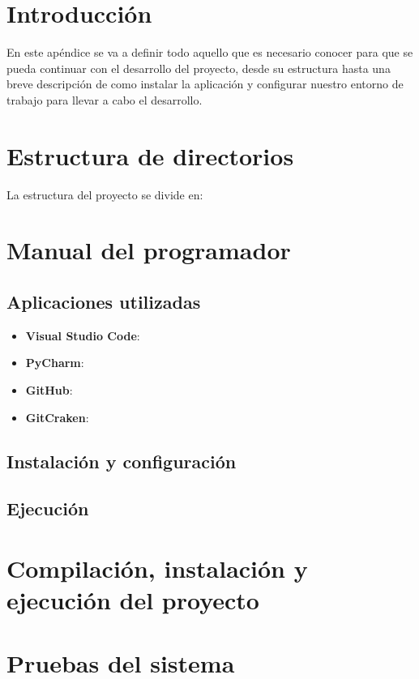 
\section{Introducción}
En este apéndice se va a definir todo aquello que es necesario conocer para que se pueda continuar con el desarrollo del proyecto, desde su estructura hasta una breve descripción de como instalar la aplicación y configurar nuestro entorno de trabajo para llevar a cabo el desarrollo.

\section{Estructura de directorios}
La estructura del proyecto se divide en:

\section{Manual del programador}
\subsection{Aplicaciones utilizadas}
\begin{itemize}
	\item \textbf{Visual Studio Code}: 
	\item \textbf{PyCharm}:
	\item \textbf{GitHub}:
	\item \textbf{GitCraken}:
\end{itemize}
\subsection{Instalación y configuración}
\subsection{Ejecución}

\section{Compilación, instalación y ejecución del proyecto}


\section{Pruebas del sistema}
